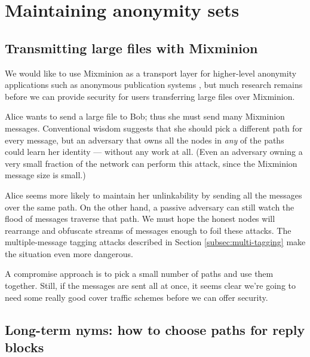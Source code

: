 \documentclass{llncs}
\begin{document}

\section{Maintaining anonymity sets}

\subsection{Transmitting large files with Mixminion}

We would like to use Mixminion as a transport layer for higher-level
anonymity applications such as anonymous publication systems
\cite{freehaven-berk}, but much research remains before we can
provide security for users transferring large files over Mixminion.

Alice wants to send a large file to Bob; thus she must send many Mixminion
messages. Conventional wisdom suggests that she should pick a different
path for every message, but an adversary that owns all the nodes in
\emph{any} of the paths could learn her identity --- without any work
at all. (Even an adversary owning a very small fraction of the network
can perform this attack, since the Mixminion message size is small.)


Alice seems more likely to maintain her unlinkability by sending all the
messages over the same path. On the other hand, a passive adversary can
still watch the flood of messages traverse that path. We must hope the
honest nodes will rearrange and obfuscate streams of messages enough to
foil these attacks. The multiple-message tagging attacks described in
Section \ref{subsec:multi-tagging} make the situation even more dangerous.

A compromise approach is to pick a small number of paths and use them
together. Still, if the messages are sent all at once, it seems clear
we're going to need some really good cover traffic schemes before we
can offer security.

\subsection{Long-term nyms: how to choose paths for reply blocks}
\label{subsec:choosing-paths}
\end{document}

